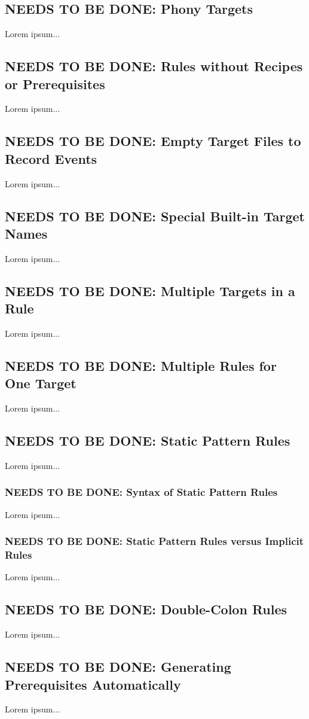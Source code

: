 \color{gray}
\subsection{NEEDS TO BE DONE: Phony Targets}
Lorem ipsum...
\color{black}

\color{gray}
\subsection{NEEDS TO BE DONE: Rules without Recipes or Prerequisites}
Lorem ipsum...
\color{black}

\color{gray}
\subsection{NEEDS TO BE DONE: Empty Target Files to Record Events}
Lorem ipsum...
\color{black}

\color{gray}
\subsection{NEEDS TO BE DONE: Special Built-in Target Names}
Lorem ipsum...
\color{black}

\color{gray}
\subsection{NEEDS TO BE DONE: Multiple Targets in a Rule}
Lorem ipsum...
\color{black}

\color{gray}
\subsection{NEEDS TO BE DONE: Multiple Rules for One Target}
Lorem ipsum...
\color{black}

\color{gray}
\subsection{NEEDS TO BE DONE: Static Pattern Rules}
Lorem ipsum...
\color{black}

\color{gray}
\subsubsection{NEEDS TO BE DONE: Syntax of Static Pattern Rules}
Lorem ipsum...
\color{black}

\color{gray}
\subsubsection{NEEDS TO BE DONE: Static Pattern Rules versus Implicit Rules}
Lorem ipsum...
\color{black}

\color{gray}
\subsection{NEEDS TO BE DONE: Double-Colon Rules}
Lorem ipsum...
\color{black}

\color{gray}
\subsection{NEEDS TO BE DONE: Generating Prerequisites Automatically}
Lorem ipsum...
\color{black}

